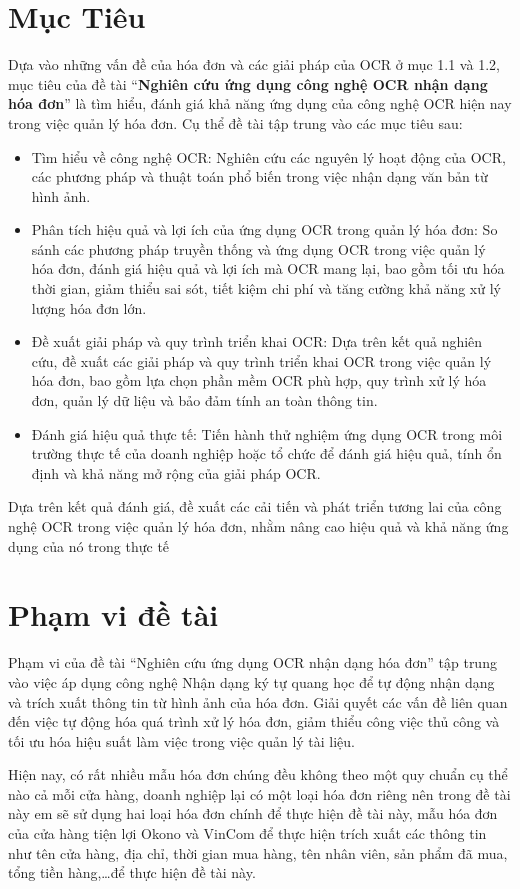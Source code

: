 \section{Mục Tiêu}
Dựa vào những vấn đề của hóa đơn và các giải pháp của OCR ở mục 1.1 và 1.2, mục tiêu của đề tài “\textbf{Nghiên cứu ứng dụng công nghệ OCR nhận dạng hóa đơn}” là tìm hiểu, đánh giá khả năng ứng dụng của công nghệ OCR hiện nay trong việc quản lý hóa đơn. Cụ thể đề tài tập trung vào các mục tiêu sau:
\begin{itemize}
    \item Tìm hiểu về công nghệ OCR: Nghiên cứu các nguyên lý hoạt động của OCR, các phương pháp và thuật toán phổ biến trong việc nhận dạng văn bản từ hình ảnh.
    \item Phân tích hiệu quả và lợi ích của ứng dụng OCR trong quản lý hóa đơn: So sánh các phương pháp truyền thống và ứng dụng OCR trong việc quản lý hóa đơn, đánh giá hiệu quả và lợi ích mà OCR mang lại, bao gồm tối ưu hóa thời gian, giảm thiểu sai sót, tiết kiệm chi phí và tăng cường khả năng xử lý lượng hóa đơn lớn.
    \item Đề xuất giải pháp và quy trình triển khai OCR: Dựa trên kết quả nghiên cứu, đề xuất các giải pháp và quy trình triển khai OCR trong việc quản lý hóa đơn, bao gồm lựa chọn phần mềm OCR phù hợp, quy trình xử lý hóa đơn, quản lý dữ liệu và bảo đảm tính an toàn thông tin.
    \item Đánh giá hiệu quả thực tế: Tiến hành thử nghiệm ứng dụng OCR trong môi trường thực tế của doanh nghiệp hoặc tổ chức để đánh giá hiệu quả, tính ổn định và khả năng mở rộng của giải pháp OCR.
\end{itemize}
Dựa trên kết quả đánh giá, đề xuất các cải tiến và phát triển tương lai của công nghệ OCR trong việc quản lý hóa đơn, nhằm nâng cao hiệu quả và khả năng ứng dụng của nó trong thực tế

\section{Phạm vi đề tài}
Phạm vi của đề tài ``Nghiên cứu ứng dụng OCR nhận dạng hóa đơn'' tập trung vào việc áp dụng công nghệ Nhận dạng ký tự quang học để tự động nhận dạng và trích xuất thông tin từ hình ảnh của hóa đơn. Giải quyết các vấn đề liên quan đến việc tự động hóa quá trình xử lý hóa đơn, giảm thiểu công việc thủ công và tối ưu hóa hiệu suất làm việc trong việc quản lý tài liệu.

Hiện nay, có rất nhiều mẫu hóa đơn chúng đều không theo một quy chuẩn cụ thể nào cả mỗi cửa hàng, doanh nghiệp lại có một loại hóa đơn riêng nên trong đề tài này em sẽ sử dụng hai loại hóa đơn chính để thực hiện đề tài này, mẫu hóa đơn của cửa hàng tiện lợi Okono và VinCom để thực hiện trích xuất các thông tin như tên cửa hàng, địa chỉ, thời gian mua hàng, tên nhân viên, sản phẩm đã mua, tổng tiền hàng,\ldots để thực hiện đề tài này.

